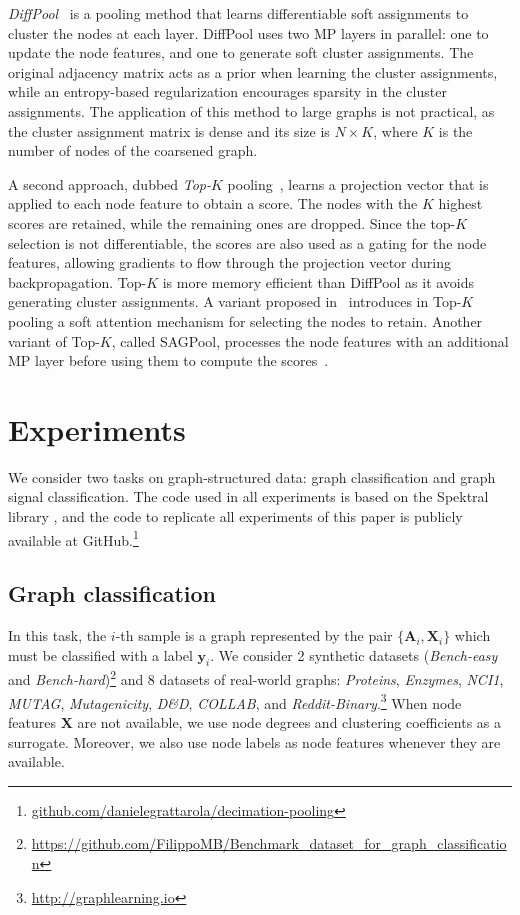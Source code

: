 \documentclass[journal]{IEEEtran}
\def\X{{\mathbf X}}
\def\A{{\mathbf A}}
\begin{document}
\textit{DiffPool}~\cite{ying2018hierarchical} is a pooling method that learns differentiable soft assignments to cluster the nodes at each layer. 
DiffPool uses two MP layers in parallel: one to update the node features, and one to generate soft cluster assignments.
The original adjacency matrix acts as a prior when learning the cluster assignments, while an entropy-based regularization encourages sparsity in the cluster assignments.
The application of this method to large graphs is not practical, as the cluster assignment matrix is dense and its size is $N \times K$, where $K$ is the number of nodes of the coarsened graph.

A second approach, dubbed \textit{Top-$K$} pooling~\cite{graphunet, cangea2018towards}, learns a projection vector that is applied to each node feature to obtain a score. 
The nodes with the $K$ highest scores are retained, while the remaining ones are dropped.
Since the top-$K$ selection is not differentiable, the scores are also used as a gating for the node features, allowing gradients to flow through the projection vector during backpropagation.
Top-$K$ is more memory efficient than DiffPool as it avoids generating cluster assignments. 
A variant proposed in~\cite{knyazev2019understanding} introduces in Top-$K$ pooling a soft attention mechanism for selecting the nodes to retain.
Another variant of Top-$K$, called SAGPool, processes the node features with an additional MP layer before using them to compute the scores~\cite{pmlr-v97-lee19c}.



\section{Experiments}
\label{sec:experiments}

We consider two tasks on graph-structured data: graph classification and graph signal classification.
The code used in all experiments is based on the Spektral library \cite{grattarola2020graph}, and the code to replicate all experiments of this paper is publicly available at GitHub.\footnote{\url{github.com/danielegrattarola/decimation-pooling}}

\subsection{Graph classification}
In this task, the $i$-th sample is a graph represented by the pair $\{ \A_i, \X_i \}$ which must be classified with a label $\mathbf{y}_i$.
We consider 2 synthetic datasets (\textit{Bench-easy} and \textit{Bench-hard})\footnote{\url{https://github.com/FilippoMB/Benchmark_dataset_for_graph_classification}} and 8 datasets of real-world graphs: \textit{Proteins}, \textit{Enzymes}, \textit{NCI1}, \textit{MUTAG}, \textit{Mutagenicity}, \textit{D\&D}, \textit{COLLAB}, and \textit{Reddit-Binary}.\footnote{\url{http://graphlearning.io}}
When node features $\X$ are not available, we use node degrees and clustering coefficients as a surrogate.
Moreover, we also use node labels as node features whenever they are available.
\end{document}

